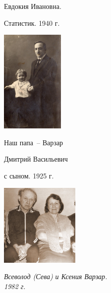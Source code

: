 \documentclass[utf8x, 12pt]{G7-32a} %
\begin{document}
\begin{figure}[h!]
\begin{minipage}[h]{55mm}
{        \hspace{20pt}Евдокия Ивановна. 
        
        \hspace{20pt}Статистик. 1940 г.}
   \end{minipage}
   \hfill
    \begin{minipage}[h!]{55mm}
        \begin{center}
        \includegraphics[height=50mm]{inc/Varzar/13.jpg}
        \end{center}
        \itshape{\hspace{20pt} Наш папа~-- Варзар 
        
        \hspace{20pt} Дмитрий Васильевич 
        
        \hspace{20pt} с сыном. 1925 г.}
    \end{minipage}
    \hfill
    \begin{minipage}[h!]{40mm}
         \vspace{30pt}
        \begin{center}
        \includegraphics[height=40mm]{inc/Varzar/14.jpg}
        \end{center}
        \itshape{Всеволод (Сева) и Ксения Варзар. \\1982 г.}
    \end{minipage}
\end{figure}
\end{document}
